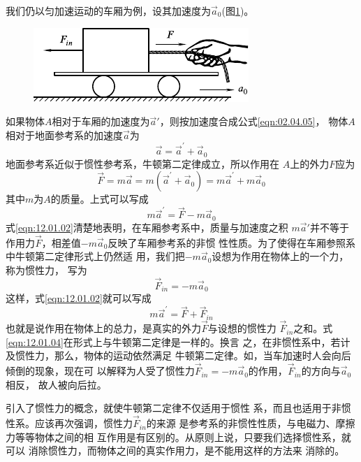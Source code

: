 我们仍以匀加速运动的车厢为例，设其加速度为$ \vec{a} _ { 0 } $(图\ref{fig:12.01})。
\begin{figure}[h]
  \centering
  \includegraphics{figure/fig12.01}
  \caption{}
  \label{fig:12.01}
\end{figure}
如果物体$ A $相对于车厢的加速度为$ \vec{a}' $，则按加速度合成公式\eqref{eqn:02.04.05}，
物体$ A $相对于地面参考系的加速度$ \vec{a} $为
\begin{equation}\label{eqn:12.01.01}
  \vec{a} = \vec{a} ^ { \prime } + \vec{a} _ { 0 }
\end{equation}
地面参考系近似于惯性参考系，牛顿第二定律成立，所以作用在
$ A $上的外力$ F $应为
\begin{equation*}
  \vec{F} = m \vec{a} = m \left( \vec{a} ^ { \prime } + \vec{a} _ { 0 } \right) = m \vec{a} ^ { \prime } + m \vec{a} _ { 0 }
\end{equation*}
其中$ m $为$ A $的质量。上式可以写成
\begin{equation}\label{eqn:12.01.02}
  m \vec{a} ^ { \prime } = \vec{F} - m \vec{a} _ { 0 }
\end{equation}
式\eqref{eqn:12.01.02}清楚地表明，在车厢参考系中，质量与加速度之积
$ m \vec{a} ' $并不等于作用力$\vec{F}$，相差值$ - m \vec{a} _ 0 $反映了车厢参考系的非惯
性性质。为了使得在车厢参照系中牛顿第二定律形式上仍然适
用，我们把$-m\vec{a}_0$设想为作用在物体上的一个力，称为惯性力，
写为
\begin{equation}\label{eqn:12.01.03}
  \vec{F} _ { in } = - m \vec{a} _ { 0 }
\end{equation}
这样，式\eqref{eqn:12.01.02}就可以写成
\begin{equation}\label{eqn:12.01.04}
  m \vec{a} ^ { \prime } = \vec{F} + \vec{F} _ {in}
\end{equation}
也就是说作用在物体上的总力，是真实的外力$\vec{F}$与设想的惯性力
$\vec{F}_{in}$之和。式\eqref{eqn:12.01.04}在形式上与牛顿第二定律是一样的。换言
之，在非惯性系中，若计及惯性力，那么，物体的运动依然满足
牛顿第二定律。如，当车加速时人会向后倾倒的现象，现在可
以解释为人受了惯性力$ \vec{F}_{in}=-m\vec{a}_0 $的作用，$\vec{F}_{in}$的方向与$\vec{a}_0$相反，
故人被向后拉。

引入了惯性力的概念，就使牛顿第二定律不仅适用于惯性
系，而且也适用于非惯性系。应该再次强调，惯性力$ \vec{F}_{in} $的来源
是参考系的非惯性性质，与电磁力、摩擦力等等物体之间的相
互作用是有区别的。从原则上说，只要我们选择惯性系，就可以
消除惯性力，而物体之间的真实作用力，是不能用这样的方法来
消除的。

